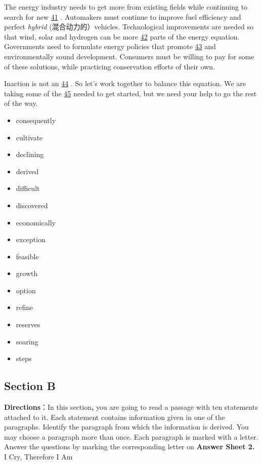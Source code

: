 \documentclass[UTF8,11pt]{ctexart}
\begin{document}
The energy industry needs to get more from existing fields while continuing to search for new \uline{41} . Automakers must continue to improve fuel efficiency and perfect\textit{ hybrid} (混合动力的）vehicles. Technological improvements are needed so that wind, solar and hydrogen can be more \uline{42} parts of the energy equation. Governments need to formulate energy policies that promote \uline{43} and environmentally sound development. Consumers must be willing to pay for some of these solutions, while practicing conservation efforts of their own.


Inaction is not an \uline{44} . So let’s work together to balance this equation. We are taking some of the \uline{45} needed to get started, but we need your help to go the rest of the way.


\begin{itemize}[leftmargin=2em,itemsep=.2em,topsep=.4em]\item[A.] consequently
\item[B.] cultivate
\item[C.] declining
\item[D.] derived
\item[E.] difficult
\item[F.] discovered
\item[G.] economically
\item[H.] exception
\item[I.] feasible
\item[J.] growth
\item[K.] option
\item[L.] refine
\item[M.] reserves
\item[N.] soaring
\item[O.] steps
\end{itemize}

\subsection*{Section B}


\textbf{Directions}：In this section\textbf{,} you are going to read a passage with ten statements attached to it. Each statement contains information given in one of the paragraphs. Identify the paragraph from which the information is derived. You may choose a paragraph more than once. Each paragraph is marked with a letter. Answer the questions by marking the corresponding letter on \textbf{Answer Sheet 2.} I Cry, Therefore I Am
\end{document}
